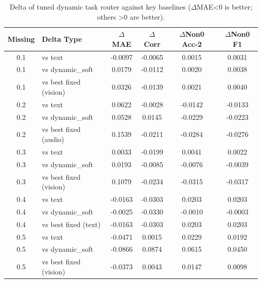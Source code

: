 \begin{table}[t]
\centering
\caption{Delta of tuned dynamic task router against key baselines ($\Delta$MAE<0 is better; others >0 are better).}
\begin{tabular}{c l c c c c}
\toprule
Missing & Delta Type & $\Delta$MAE & $\Delta$Corr & $\Delta$Non0 Acc-2 & $\Delta$Non0 F1 \\
\midrule
0.1 & vs text & -0.0097 & -0.0065 & 0.0015 & 0.0031 \\
0.1 & vs dynamic\_soft & 0.0179 & -0.0112 & 0.0020 & 0.0038 \\
0.1 & vs best fixed (vision) & 0.0326 & -0.0139 & 0.0021 & 0.0040 \\
\midrule
0.2 & vs text & 0.0622 & -0.0028 & -0.0142 & -0.0133 \\
0.2 & vs dynamic\_soft & 0.0528 & 0.0145 & -0.0229 & -0.0223 \\
0.2 & vs best fixed (audio) & 0.1539 & -0.0211 & -0.0284 & -0.0276 \\
\midrule
0.3 & vs text & 0.0033 & -0.0199 & 0.0041 & 0.0022 \\
0.3 & vs dynamic\_soft & 0.0193 & -0.0085 & -0.0076 & -0.0039 \\
0.3 & vs best fixed (vision) & 0.1079 & -0.0234 & -0.0315 & -0.0317 \\
\midrule
0.4 & vs text & -0.0163 & -0.0303 & 0.0203 & 0.0203 \\
0.4 & vs dynamic\_soft & -0.0025 & -0.0330 & -0.0010 & -0.0003 \\
0.4 & vs best fixed (text) & -0.0163 & -0.0303 & 0.0203 & 0.0203 \\
\midrule
0.5 & vs text & -0.0471 & 0.0015 & 0.0229 & 0.0192 \\
0.5 & vs dynamic\_soft & -0.0866 & 0.0874 & 0.0615 & 0.0450 \\
0.5 & vs best fixed (vision) & -0.0373 & 0.0043 & 0.0147 & 0.0098 \\
\midrule
\bottomrule
\end{tabular}
\end{table}
